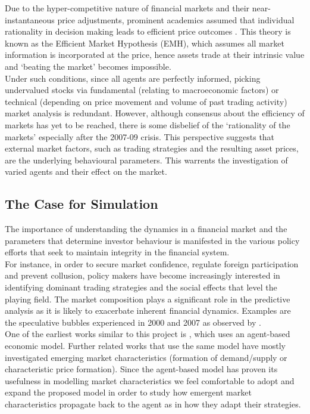 \documentclass[11pt]{article}
\begin{document}
Due to the hyper-competitive nature of financial markets and their near-instantaneous price adjustments, prominent academics assumed that individual rationality in decision making leads to efficient price outcomes \citep{zeckhauser1991nonrational}. This theory is known as the Efficient Market Hypothesis (EMH), which assumes all market information is incorporated at the price, hence assets trade at their intrinsic value and `beating the market' becomes impossible. \\
Under such conditions, since all agents are perfectly informed, picking undervalued stocks via fundamental (relating to macroeconomic factors) or technical (depending on price movement and volume of past trading activity) market analysis is redundant. However, although consensus about the efficiency of markets has yet to be reached, there is some disbelief of the ‘rationality of the markets’ especially after the 2007-09 crisis. This perspective suggests that external market factors, such as trading strategies and the resulting asset prices, are the underlying behavioural parameters. This warrents the investigation of varied agents and their effect on the market. \\

\subsection{The Case for Simulation}
The importance of understanding the dynamics in a financial market and the parameters that determine investor behaviour is manifested in the various policy efforts that seek to maintain integrity in the financial system.\\
For instance, in order to secure market confidence, regulate foreign participation and prevent collusion, policy makers have become increasingly interested in identifying dominant trading strategies and the social effects that level the playing field. The market composition plays a significant role in the predictive analysis as it is likely to exacerbate inherent financial dynamics. Examples are the speculative bubbles experienced in 2000 and 2007 as observed by \citet{kaisoji2015super}. \\
One of the earliest works similar to this project is \citet{de1990noise}, which uses an agent-based economic model. Further related works that use the same model have mostly investigated emerging market characteristics (formation of demand/supply or characteristic price formation). Since the agent-based model has proven its usefulness in modelling market characteristics we feel comfortable to adopt and expand the proposed model in order to study how emergent market characteristics propagate back to the agent as in how they adapt their strategies.
\end{document}
